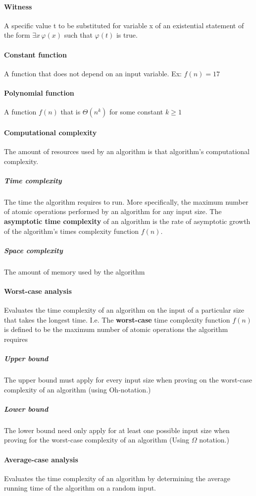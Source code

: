 \documentclass[a4paper]{article}
\begin{document}
\paragraph{Witness} A specific value t to be substituted for variable x of an existential statement of the form $\exists x \, \varphi (x)$ such that $\varphi (t)$ is true.
\paragraph{Constant function} A function that does not depend on an input variable. Ex: $f(n) = 17$
\paragraph{Polynomial function} A function $f(n)$ that is $\Theta (n^k)$ for some constant $k \geq 1$
\paragraph{Computational complexity} The amount of resources used by an algorithm is that algorithm's computational complexity.
\subparagraph{Time complexity} The time the algorithm requires to run. More specifically, the maximum number of atomic operations performed by an algorithm for any input size. The \textbf{asymptotic time complexity} of an algorithm is the rate of asymptotic growth of the algorithm's times complexity function $f(n)$.
\subparagraph{Space complexity} The amount of memory used by the algorithm
\paragraph{Worst-case analysis} Evaluates the time complexity of an algorithm on the input of a particular size that takes the longest time. I.e. The \textbf{worst-case} time complexity function $f(n)$ is defined to be the maximum number of atomic operations the algorithm requires
\subparagraph{Upper bound} The upper bound must apply for every input size when proving on the worst-case complexity of an algorithm (using Oh-notation.)
\subparagraph{Lower bound} The lower bound need only apply for at least one possible input size when proving for the worst-case complexity of an algorithm (Using $\Omega$ notation.)
\paragraph{Average-case analysis} Evaluates the time complexity of an algorithm by determining the average running time of the algorithm on a random input.
\end{document}
